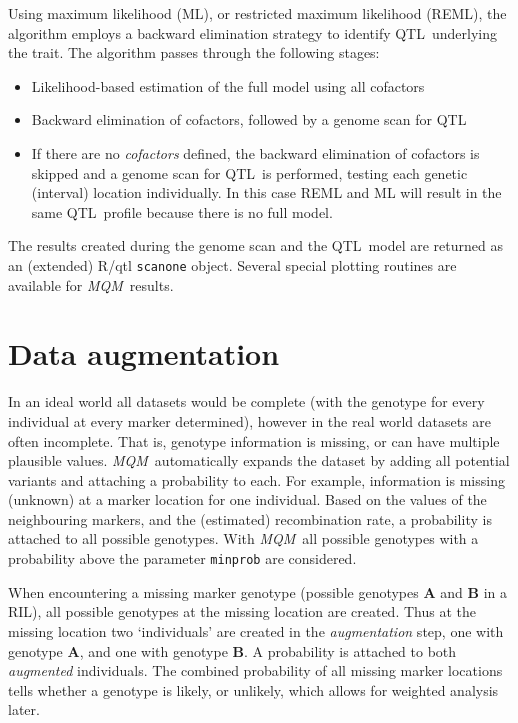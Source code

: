 \documentclass[11pt]{article}
\newcommand{\mqm}{\emph{MQM}}
\newcommand{\qtl}{QTL}
\newcommand{\code}{\texttt}
\begin{document}
Using maximum likelihood (ML), or restricted maximum likelihood (REML), the
algorithm employs a backward elimination strategy to identify \qtl\ underlying
the trait. The algorithm passes through the following stages:

\begin{itemize}
\item Likelihood-based estimation of the full model using all cofactors
\item Backward elimination of cofactors, followed by a
      genome scan for \qtl
\item If there are no \emph{cofactors\/} defined, the backward elimination of cofactors
      is skipped and a genome scan for \qtl\ is performed, testing each genetic (interval)
      location individually. In this case REML and ML will result in the same \qtl\ profile
      because there is no full model.
\end{itemize}

The results created during the genome scan and the \qtl\ model are
returned as an (extended) R/qtl \code{scanone} object. Several special
plotting routines are available for \mqm\ results.


\section{Data augmentation}
\label{augmentation}

In an ideal world all datasets would be complete (with the genotype
for every
individual at every marker determined), however in the real world datasets are often incomplete. That is, genotype
information is missing, or can have multiple plausible values. \mqm\
automatically expands the
dataset by adding all potential variants and attaching a probability to each.  For
example, information is missing (unknown) at a marker location for one
individual. Based on the values of the neighbouring markers, and the
(estimated) recombination rate, a probability is attached to all possible
genotypes.  With \mqm\ all possible genotypes with a probability above
the
parameter \code{minprob} are considered.

When encountering a missing marker genotype (possible genotypes {\bf A} and {\bf B} in a
RIL), all possible genotypes at the missing location are created.  Thus at
the missing location two `individuals' are created in the \emph{augmentation} step,
one with genotype {\bf A}, and one with genotype {\bf B}. A probability is
attached to both \emph{augmented} individuals.  The combined probability of all
missing marker locations tells whether a genotype is likely, or unlikely,
which allows for weighted analysis later.
\end{document}
